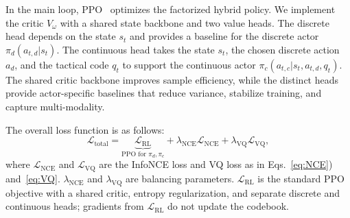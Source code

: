 In the main loop, PPO~\cite{schulman2017proximal} optimizes the factorized hybrid policy.
We implement the critic $V_\omega$ with a shared state backbone and two value heads.
The discrete head depends on the state $s_t$ and provides a baseline for the discrete actor $\pi_d(a_{t,d}|s_t)$. The continuous head takes the state $s_t$, the chosen discrete action $a_d$, and the tactical code $q_t$ to support the continuous actor $\pi_c(a_{t,c}|s_t, a_{t,d}, q_t)$.
The shared critic backbone improves sample efficiency, while the distinct heads provide actor-specific baselines that reduce variance, stabilize training, and capture multi-modality.

The overall loss function is as follows:
\begin{equation}
    \mathcal{L}_{\text{total}}=\underbrace{\mathcal{L}_{\text{RL}}}_{\text{PPO for } \pi_d, \pi_c} + \lambda_{\text{NCE}}\mathcal{L}_{\text{NCE}}+\lambda_{\text{VQ}}\mathcal{L}_{\text{VQ}},
    \label{eq:overall_loss}
\end{equation}
where $\mathcal{L}_{\text{NCE}}$ and $\mathcal{L}_{\text{VQ}}$ are the InfoNCE loss and VQ loss as in Eqs.~\eqref{eq:NCE}) and~\eqref{eq:VQ}. 
$\lambda_{\text{NCE}}$ and $\lambda_{\text{VQ}}$ are balancing parameters.
$\mathcal{L}_{\text{RL}}$ is the standard PPO objective with a shared critic, entropy regularization, and separate discrete and continuous heads; gradients from $\mathcal{L}_{\text{RL}}$ do not update the codebook.